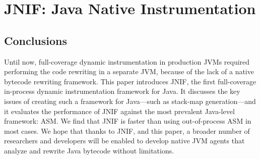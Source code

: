 
\section{JNIF: Java Native Instrumentation}

\subsection{Conclusions}

Until now, full-coverage dynamic instrumentation in production JVMs required performing the code rewriting in a separate JVM, 
because of the lack of a native bytecode rewriting framework.
This paper introduces JNIF, the first full-coverage in-process dynamic instrumentation framework for Java.
It discusses the key issues of creating such a framework for Java---such as stack-map generation---and
it evaluates the performance of JNIF against the most prevalent Java-level framework: ASM.
We find that JNIF is faster than using out-of-process ASM in most cases.
We hope that thanks to JNIF, and this paper, a broader number of researchers and developers will
be enabled to develop native JVM agents that analyze and rewrite Java bytecode without limitations. 